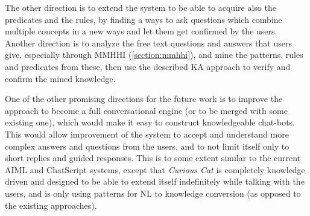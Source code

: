 The other direction is to extend the system to be able to acquire also the
predicates and the rules, by finding a ways to ask questions which combine 
multiple concepts in a new ways and let them get confirmed by the users. 
Another direction is to analyze the free text questions and answers that users
give, especially through MMHHI (\autoref{section:mmhhi}), and mine the patterns,
rules and predicates from these, then use the described KA approach to verify
and confirm the mined knowledge.

One of the other promising directions for the future work is to improve the
approach to become a full conversational engine (or to be merged with some 
existing one), which would make it easy to construct knowledgeable chat-bots. 
This would allow improvement of the system to accept and understand more 
complex answers and questions from the users, and to not limit itself only to 
short replies and guided responses. This is to some extent similar to the 
current AIML and ChatScript systems, except that \emph{Curious Cat} is 
completely knowledge driven and designed to be able to extend itself 
indefinitely while talking with the users, and is only using patterns for NL 
to knowledge conversion (as opposed to the existing approaches). 

